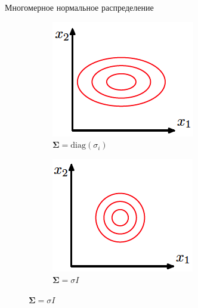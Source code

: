 \documentclass[aspectratio=169]{beamer}
\begin{document}
\begin{frame}{Многомерное нормальное распределение}
\begin{figure}
\begin{subfigure}[b]{0.23\textwidth}
                \caption{}     
        \end{subfigure}
        \begin{subfigure}[b]{0.23\textwidth}
                \includegraphics[width=\textwidth]{images/dnormal.png}
                \caption{$\mathbf{\Sigma} = \text{diag}(\sigma_i)$}
        \end{subfigure}
        \begin{subfigure}[b]{0.23\textwidth}
                \includegraphics[width=\textwidth]{images/enormal.png}
                \caption{$\mathbf{\Sigma} = \sigma I$}
        \end{subfigure}
\end{figure}

\end{frame}
\end{document}
